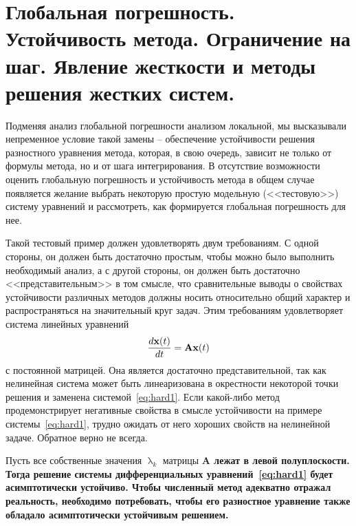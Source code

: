 \documentclass[../../calc-math-exam-2023.tex]{subfiles}
\begin{document}
    \section{Глобальная погрешность. Устойчивость метода. Ограничение на шаг. Явление жесткости и методы решения жестких систем.}\label{sec:ch27}
    Подменяя анализ глобальной погрешности анализом локальной, мы высказывали непременное условие такой замены --
    обеспечение устойчивости решения разностного уравнения метода, которая, в свою очередь, зависит не только от формулы
    метода, но и от шага интегрирования. В отсутствие возможности оценить глобальную погрешность и устойчивость метода
    в общем случае появляется желание выбрать некоторую простую модельную (<<тестовую>>) систему уравнений и рассмотреть,
    как формируется глобальная погрешность для нее.

    Такой тестовый пример должен удовлетворять двум требованиям. С одной стороны, он должен быть достаточно простым,
    чтобы можно было выполнить необходимый анализ, а с другой стороны, он должен быть достаточно <<представительным>> в
    том смысле, что сравнительные выводы о свойствах устойчивости различных методов должны носить относительно общий
    характер и распространяться на значительный круг задач. Этим требованиям удовлетворяет система линейных уравнений
    \begin{equation}
        \frac{d\bf{x}(t)}{dt} = \bf{A}\bf{x}(t) \label{eq:hard1}
    \end{equation}
    с постоянной матрицей. Она является достаточно представительной, так как нелинейная система может быть линеаризована
    в окрестности некоторой точки решения и заменена системой~\eqref{eq:hard1}. Если какой-либо метод продемонстрирует
    негативные свойства в смысле устойчивости на примере системы~\eqref{eq:hard1}, трудно ожидать от него хороших свойств
    на нелинейной задаче. Обратное верно не всегда.

    Пусть все собственные значения $\uplambda_k$ матрицы \bf{A} лежат в левой полуплоскости. Тогда решение системы
    дифференциальных уравнений~\eqref{eq:hard1} будет асимптотически устойчиво. Чтобы численный метод адекватно отражал
    реальность, необходимо потребовать, чтобы его разностное уравнение также обладало асимптотически устойчивым решением.
\end{document}
